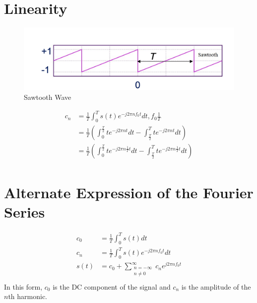 \documentclass[oneside]{book}
\begin{document}
            \section{Linearity}
                \begin{figure}[H]
                    \centering
                    \includegraphics[width=0.5\linewidth]{figures/linearity.png}
                    \caption{Sawtooth Wave}
                \end{figure}
                \begin{align*}
                    c_n &= \frac{1}{T} \int^{T}_{0} s(t) e^{-j2\pi n f_0 t} dt, f_0  \frac{1}{T}\\
                    &= \frac{1}{T} \left(\int^{\frac{T}{2}}_{0} t e^{-j2\pi n t} dt - \int^{T}_{\frac{T}{2}} t e^{-j2\pi n t} dt\right)\\
                    &= \frac{1}{T} \left(\int^{\frac{T}{2}}_{0} t e^{-j2\pi n \frac{1}{T} t} dt - \int^{T}_{\frac{T}{2}} t e^{-j2\pi n \frac{1}{T} t} dt\right)\\
                \end{align*}
            \section{Alternate Expression of the Fourier Series}
                \begin{align*}
                    c_0 &= \frac{1}{T} \int^{T}_{0} s(t) dt\\
                    c_n &= \frac{1}{T} \int^{T}_{0} s(t) e^{-j2\pi n f_0 t} dt\\
                    s(t) &= c_0 + \sum_{\substack{n=-\infty\\ n\neq 0}}^{\infty} c_n e^{j2\pi n f_0 t}\\
                \end{align*}
                In this form, $c_0$ is the DC component of the signal and $c_n$ is the amplitude of the $n$th harmonic.
\end{document}
